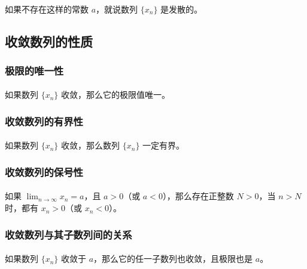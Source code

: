 \paragraph{}
如果不存在这样的常数 $a$，就说数列 $\{x_n\}$ 是发散的。

\subsection{收敛数列的性质}
\subsubsection{极限的唯一性}
\paragraph{}
如果数列 $\{x_n\}$ 收敛，那么它的极限值唯一。

\subsubsection{收敛数列的有界性}
\paragraph{}
如果数列 $\{x_n\}$ 收敛，那么数列 $\{x_n\}$ 一定有界。

\subsubsection{收敛数列的保号性}
\paragraph{}
如果 $\displaystyle{\lim_{n \to \infty}} x_n = a$，且 $a > 0$（或 $a < 0$），那么存在正整数 $N > 0$，当 $n > N$ 时，都有 $x_n > 0$（或 $x_n < 0$）。

\subsubsection{收敛数列与其子数列间的关系}
\paragraph{}
如果数列 $\{x_n\}$ 收敛于 $a$，那么它的任一子数列也收敛，且极限也是 $a$。
